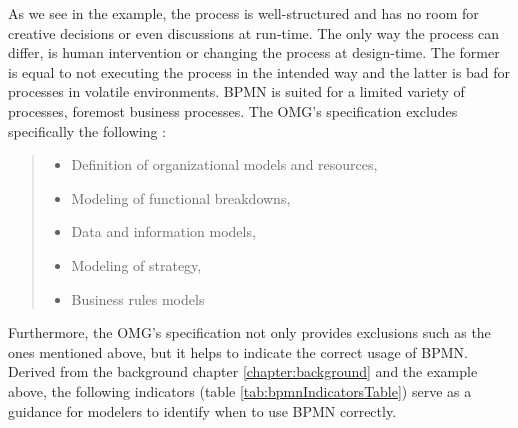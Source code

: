 As we see in the example, the process is well-structured and has no room for creative decisions or even discussions at run-time. The only way the process can differ, is human intervention or changing the process at design-time. The former is equal to not executing the process in the intended way and the latter is bad for processes in volatile environments. BPMN is suited for a limited variety of processes, foremost business processes. The OMG's specification excludes specifically the following \cite{BPMNspec}: 

\begin{quote}

\begin{itemize}
\item Definition of organizational models and resources,
\item Modeling of functional breakdowns,
\item Data and information models,
\item Modeling of strategy,
\item Business rules models
\end{itemize}

\end{quote}


Furthermore, the OMG's specification not only provides exclusions such as the ones mentioned above, but it helps to indicate the correct usage of BPMN. Derived from the background chapter \ref{chapter:background} and the example above, the following indicators (table \ref{tab:bpmnIndicatorsTable}) serve as a guidance for modelers to identify when to use BPMN correctly. 

